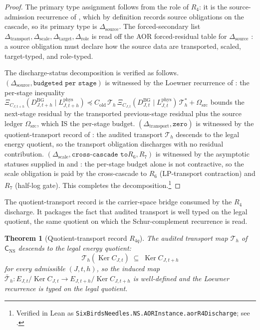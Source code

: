 \documentclass[11pt]{article}
\DeclareMathOperator{\Ker}{Ker}
\newcommand{\preceqq}{\preceq}
\newcommand{\DBG}{D^{\mathrm{BG}}}
\newcommand{\Lphys}{L^{\mathrm{phys}}}
\newcommand{\Omsrc}{\Omega_{\mathrm{src}}}
\newtheorem{theorem}{Theorem}[section]
\theoremstyle{definition}
\begin{document}
\begin{proof}
The primary type assignment follows from the role of \(R_4\):
it is the source-admission recurrence of
, which by definition
records source obligations on the cascade, so its primary type
is \(\Delta_{\mathrm{source}}\).  The forced-secondary list
\(\Delta_{\mathrm{transport}},\Delta_{\mathrm{scale}},
\Delta_{\mathrm{target}},\Delta_{\mathrm{role}}\) is read off
the AOR forced-residual table for \(\Delta_{\mathrm{source}}\)
\citep{Tsiokos2026AOR}: a source obligation must declare how
the source data are transported, scaled, target-typed, and
role-typed.

The discharge-status decomposition is verified as follows.
\((\Delta_{\mathrm{source}},\texttt{budgeted per stage})\) is
witnessed by the Loewner recurrence of
: the per-stage
inequality
\(\Xi_{C_{J,t+h}}(\DBG_{J,t+h}\mid\Lphys_{J,t+h})
\preceqq C_{\mathrm{old}}\,\mathcal T_h\,
\Xi_{C_{J,t}}(\DBG_{J,t}\mid\Lphys_{J,t})\,\mathcal T_h^*
+\Omsrc\) bounds the next-stage residual by the transported
previous-stage residual plus the source ledger \(\Omsrc\),
which IS the per-stage budget.
\((\Delta_{\mathrm{transport}},\texttt{zero})\) is witnessed
by the quotient-transport record of
: the audited
transport \(\mathcal T_h\) descends to the legal energy
quotient, so the transport obligation discharges with no
residual contribution.
\((\Delta_{\mathrm{scale}},\texttt{cross-cascade to
}R_6,R_7)\) is witnessed by the asymptotic statuses supplied
in  and
: the per-stage budget alone is
not contractive, so the scale obligation is paid by the
cross-cascade to \(R_6\) (LP-transport contraction) and
\(R_7\) (half-log gate).  This completes the decomposition.\footnote{Verified in Lean as \texttt{SixBirdsNeedles.NS.AORInstance.aorR4Discharge}; see .}
\end{proof}

The quotient-transport record is the carrier-space bridge consumed by
the \(R_4\) discharge.  It packages the fact that audited transport is
well typed on the legal quotient, the same quotient on which the
Schur-complement recurrence is read.

\begin{theorem}[Quotient-transport record $R_{4q}$]\label{thm:ns:aor-quotient-transport-record}
The audited transport map $\mathcal T_h$ of $\mathsf C_{\mathrm{NS}}$ descends to the legal energy quotient:
\[
  \mathcal T_h(\Ker C_{J,t}) \;\subseteq\; \Ker C_{J,t+h}
\]
for every admissible $(J,t,h)$, so the induced map $\bar{\mathcal T}_h:E_{J,t}/\Ker C_{J,t}\to E_{J,t+h}/\Ker C_{J,t+h}$ is well-defined and the Loewner recurrence is typed on the legal quotient.
\end{theorem}
\end{document}
